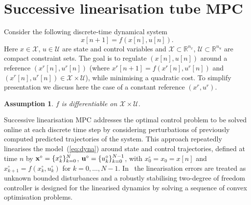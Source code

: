 \documentclass[a4paper, 10 pt, conference]{IEEEconf}
\newtheorem{assumption}{Assumption}
\def\RR{\mathbb{R}}
\def\S{\mathcal{S}}
\def\U{\mathcal{U}}
\def\X{\mathcal{X}}
\begin{document}




\section{Successive linearisation tube MPC}
\label{sec:TMPC}

Consider the following discrete-time dynamical system 
%
\begin{equation}
\label{eq:dyna}
x[n+1] = f(x[n], u[n]) .
\end{equation}
Here $x \in \X$, $u \in \U$ are state and control variables and $\X\subset\RR^{n_x}$, $\U\subset\RR^{n_u}$ are compact constraint sets. The goal is to regulate $(x[n],u[n])$ around a reference  $(x^r[n],u^r[n])$ (where ${x^r[n+1]} = f(x^r[n],u^r[n])$ and $(x^r[n],u^r[n])\in\X\times\U$), while minimising a quadratic cost. 
%
To simplify presentation we discuss here the case of a constant reference $(x^r,u^r)$.

\begin{assumption}\label{assump:lin}
$f$ is differentiable on $\X\times\U$.
\end{assumption}

%
Successive linearisation MPC addresses the optimal control problem to be solved online at each discrete time step by considering perturbations of previously computed predicted trajectories of the system.
% 
This approach repeatedly linearises the model~(\ref{eq:dyna}) around state and control trajectories, defined at time $n$ by ${\bf x}^\circ = \{x_k^\circ\}_{k=0}^N$, ${\bf u}^\circ=\{u_k^\circ\}_{k=0}^{N-1}$, with $x^\circ_0=x_0=x[n]$ and $x^\circ_{k+1} = f(x_k^\circ,u_k^\circ)$ for $k=0,\ldots,{N-1}$.
In~\cite{mark} the linearisation errors are treated as unknown bounded disturbances and a robustly stabilising two-degree of freedom controller is designed for the linearised dynamics by solving a sequence of convex optimisation problems.  
\end{document}
